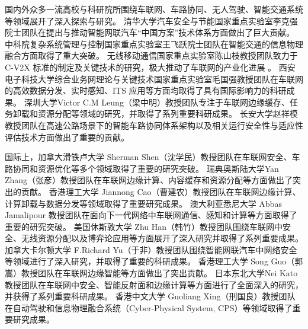 国内外众多一流高校与科研院所围绕车联网、车路协同、无人驾驶、智能交通系统等领域展开了深入探索与研究。
清华大学汽车安全与节能国家重点实验室李克强院士团队在提出与推动智能网联汽车“中国方案”技术体系方面做出了巨大贡献\cite{wang2023design, li2017dynamical, zheng2016stability}。
中科院复杂系统管理与控制国家重点实验室王飞跃院士团队在智能交通的信息物理融合方面取得了重大突破\cite{li2023sharing, liu2021cyber, lv2021guest}。
无线移动通信国家重点实验室陈山枝教授团队致力于 C-V2X 标准的制定及关键技术的研究，极大推动了车联网的产业化进展 \cite{chen2023cellular, chen2020a, chen2017vehicle}。
西安电子科技大学综合业务网理论与关键技术国家重点实验室毛国强教授团队在车联网的高效数据分发\cite{zhang2022new}、实时感知\cite{hao2022dhcloc}、ITS 应用\cite{yue2022towards}等方面均取得了具有国际影响力的科研成果。
深圳大学Victor C.M Leung（梁中明）教授团队专注于车联网边缘缓存\cite{sun2023federated}、任务卸载\cite{ju2023joint}和资源分配\cite{wang2022efficient}等领域的研究，并取得了系列重要科研成果。
长安大学赵祥模教授团队在高速公路场景下的智能车路协同体系架构以及相关运行安全性与适应性评估技术方面做出了重要的贡献\cite{fang2022a, fang2022on, jing2022integrated}。

国际上，加拿大滑铁卢大学 Sherman Shen（沈学民）教授团队在车联网安全\cite{chen2022adaptive}、车路协同\cite{liu2022real}和资源优化\cite{li2022cost}等多个领域取得了重要的研究突破。
瑞典奥斯陆大学Yan Zhang（张彦）教授团队在车联网边缘计算\cite{dai2022adaptive}、内容缓存\cite{zhang2022digital}和资源分配\cite{sun2022dynamic}等方面做出了突出的贡献。
香港理工大学 Jiannong Cao（曹建农）教授团队在车联网边缘计算\cite{yang2022delegating}、计算卸载\cite{dai2023a}与数据分发\cite{yang2020efficient}等领域取得了重要研究成果。
澳大利亚悉尼大学 Abbas Jamalipour 教授团队在面向下一代网络中车联网通信\cite{qi2022energy}、感知\cite{iranmanesh2022a}和计算\cite{alam2022multi}等方面取得了重要的研究突破。
美国休斯敦大学 Zhu Han（韩竹）教授团队围绕车联网中安全\cite{khan2023federated}、无线资源分配\cite{zhang2023mean}以及博弈论应用\cite{kang2021joint}等方面展开了深入研究并取得了系列重要成果。
加拿大卡尔顿大学 F.Richard Yu（于非）教授团队围绕智能网联汽车中网络安全\cite{alladi2023ambient, liang2023a, bai2022detection}等领域进行了深入研究，并取得了重要的科研成果。
香港理工大学 Song Guo（郭嵩）教授团队在车联网边缘智能\cite{wang2922imitation, ren2021blockchain, wang2022design}等方面做出了突出贡献。
日本东北大学Nei Kato教授团队在车联网中安全\cite{tang2020future}、智能反射面\cite{zhu2022intelligent}和边缘计算\cite{liu2020smart}等方面进行了全面深入的研究，并获得了系列重要科研成果。
香港中文大学 Guoliang Xing（刑国良）教授团队在自动驾驶\cite{he2021vi}和信息物理融合系统（Cyber-Physical System, CPS）\cite{shi2022vips}等领域取得了重要研究成果。

